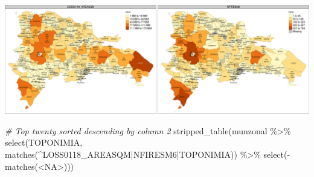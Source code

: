 \documentclass[10pt,landscape,a3paper]{article}
\newenvironment{Shaded}{\begin{snugshade}}{\end{snugshade}}
\newcommand{\CommentTok}[1]{\textcolor[rgb]{0.56,0.35,0.01}{\textit{#1}}}
\newcommand{\FunctionTok}[1]{\textcolor[rgb]{0.00,0.00,0.00}{#1}}
\newcommand{\NormalTok}[1]{#1}
\newcommand{\SpecialCharTok}[1]{\textcolor[rgb]{0.00,0.00,0.00}{#1}}
\newcommand{\StringTok}[1]{\textcolor[rgb]{0.31,0.60,0.02}{#1}}
\begin{document}
\begin{center}\includegraphics{img/data-download-preparation-eda/zonal-mun-7} \end{center}

\begin{Shaded}
\begin{Highlighting}[]
\CommentTok{\# Top twenty sorted descending by column 2}
\FunctionTok{stripped\_table}\NormalTok{(munzonal }\SpecialCharTok{\%\textgreater{}\%} \FunctionTok{select}\NormalTok{(TOPONIMIA, }\FunctionTok{matches}\NormalTok{(}\StringTok{\textquotesingle{}\^{}LOSS0118\_AREASQM|NFIRESM6|TOPONIMIA\textquotesingle{}}\NormalTok{)) }\SpecialCharTok{\%\textgreater{}\%} \FunctionTok{select}\NormalTok{(}\SpecialCharTok{{-}}\FunctionTok{matches}\NormalTok{(}\StringTok{\textquotesingle{}\textless{}NA\textgreater{}\textquotesingle{}}\NormalTok{)))}
\end{Highlighting}
\end{Shaded}
\end{document}

